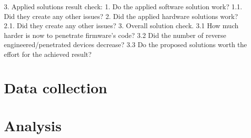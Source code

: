 \documentclass[]{report}
\begin{document}
3. Applied solutions result check:
1. Do the applied software solution work?
1.1. Did they create any other issues?
2. Did the applied hardware solutions work?
2.1. Did they create any other issues?
3. Overall solution check.
3.1 How much harder is now to penetrate firmware's code?
3.2 Did the number of reverse engineered/penetrated devices decrease?
3.3 Do the proposed solutions worth the effort for the achieved result?
\section{Data collection}
\section{Analysis}
\end{document}
